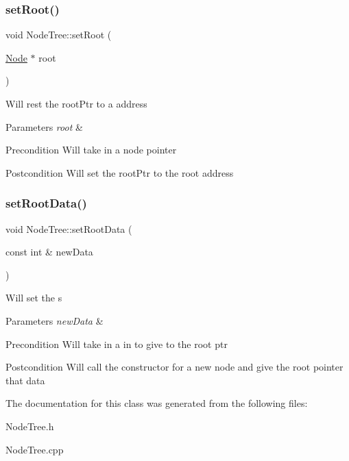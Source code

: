 \subsubsection{\texorpdfstring{set\+Root()}{setRoot()}}
{\footnotesize\ttfamily void Node\+Tree\+::set\+Root (\begin{DoxyParamCaption}\item[{\mbox{\hyperlink{class_node}{Node}} $\ast$}]{root }\end{DoxyParamCaption})}

Will rest the root\+Ptr to a address 
\begin{DoxyParams}{Parameters}
{\em root} & \\
\hline
\end{DoxyParams}
\begin{DoxyPrecond}{Precondition}
Will take in a node pointer 
\end{DoxyPrecond}
\begin{DoxyPostcond}{Postcondition}
Will set the root\+Ptr to the root address 
\end{DoxyPostcond}
\mbox{\label{class_node_tree_aa354f6975e4e1123b47a21948d00e1b2}} 
\subsubsection{\texorpdfstring{set\+Root\+Data()}{setRootData()}}
{\footnotesize\ttfamily void Node\+Tree\+::set\+Root\+Data (\begin{DoxyParamCaption}\item[{const int \&}]{new\+Data }\end{DoxyParamCaption})}

Will set the s 
\begin{DoxyParams}{Parameters}
{\em new\+Data} & \\
\hline
\end{DoxyParams}
\begin{DoxyPrecond}{Precondition}
Will take in a in to give to the root ptr 
\end{DoxyPrecond}
\begin{DoxyPostcond}{Postcondition}
Will call the constructor for a new node and give the root pointer that data 
\end{DoxyPostcond}


The documentation for this class was generated from the following files\+:\begin{DoxyCompactItemize}
\item 
Node\+Tree.\+h\item 
Node\+Tree.\+cpp\end{DoxyCompactItemize}
